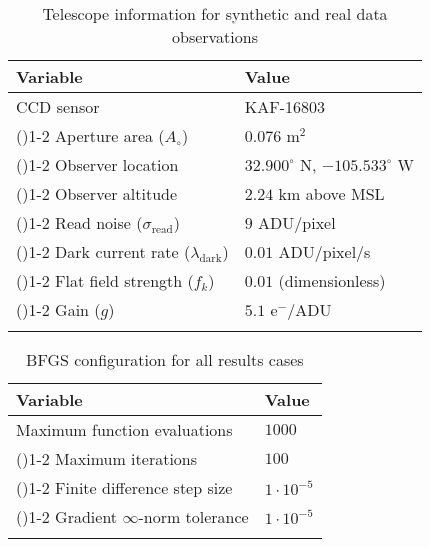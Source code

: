 \documentclass[a4paper,twocolumn]{spaceDebrisC} %
\newcommand{\grule}[0]{\arrayrulecolor{darkgray}\cmidrule(){1-2}}
\newcommand{\brule}[0]{\arrayrulecolor{black} \bottomrule}
\begin{document}
\begin{table}[H]
  \centering
  \renewcommand{\arraystretch}{1.2} 
  \caption{Telescope information for synthetic and real data observations}
  \vspace*{6pt}
  \begin{tabular}{@{} l l @{}}
    \toprule
 Variable & Value \\ \midrule
 CCD sensor & KAF-16803 \\ \grule
 Aperture area ($A_\circ$) & $0.076$ m$^2$ \\ \grule
 Observer location & $32.900^\circ$ N, $-105.533^\circ$ W \\ \grule
 Observer altitude & $2.24$ km above MSL \\ \grule
 Read noise ($\sigma_\text{read}$) & $9$ ADU/pixel \\ \grule
 Dark current rate ($\lambda_\text{dark}$) & $0.01$ ADU/pixel/s \\ \grule
 Flat field strength ($f_k$) & $0.01$ (dimensionless) \\ \grule
 Gain ($g$) & $5.1$ e$^-$/ADU \\ \brule
  \end{tabular}
  \label{tb:tele_info}
\end{table}

\begin{table}[H]
  \centering
  \renewcommand{\arraystretch}{1.2} 
  \caption{BFGS configuration for all results cases}
  \vspace*{6pt}
  \begin{tabular}{@{} l l @{}}
    \toprule
 Variable & Value \\ \midrule
 Maximum function evaluations & $1000$ \\ \grule
 Maximum iterations & $100$ \\ \grule
 Finite difference step size & $1 \cdot 10^{-5}$ \\ \grule
 Gradient $\infty$-norm tolerance & $1 \cdot 10^{-5}$ \\ \brule
  \end{tabular}
  \label{tb:bfgs_info}
\end{table}



\end{document}
